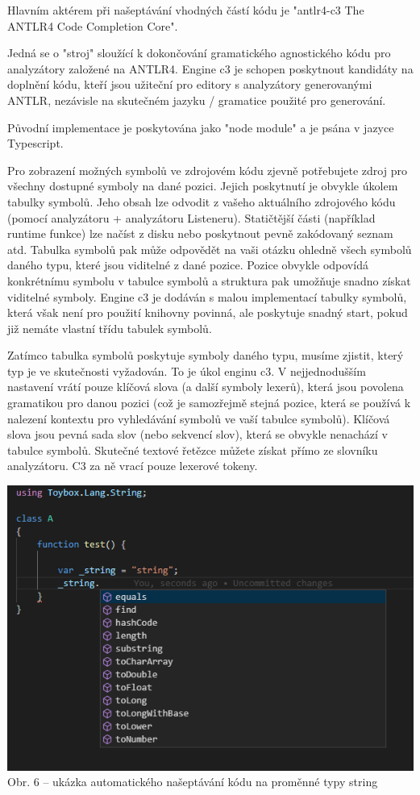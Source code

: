 \documentclass[czech,master,dept460,male,cpp,cpdeclaration]{diploma}
\begin{document}
Hlavním aktérem při našeptávání vhodných částí kódu je "antlr4-c3 The ANTLR4 Code Completion Core".

Jedná se o "stroj" sloužící k dokončování gramatického agnostického kódu pro analyzátory založené na ANTLR4. Engine c3 je schopen poskytnout kandidáty na doplnění kódu, kteří jsou užiteční pro editory s analyzátory generovanými ANTLR, nezávisle na skutečném jazyku / gramatice použité pro generování.

Původní implementace je poskytována jako "node module" a je psána v jazyce Typescript.

Pro zobrazení možných symbolů ve zdrojovém kódu zjevně potřebujete zdroj pro všechny dostupné symboly na dané pozici. Jejich poskytnutí je obvykle úkolem tabulky symbolů. Jeho obsah lze odvodit z vašeho aktuálního zdrojového kódu (pomocí analyzátoru + analyzátoru Listeneru). Statičtější části (například runtime funkce) lze načíst z disku nebo poskytnout pevně zakódovaný seznam atd. Tabulka symbolů pak může odpovědět na vaši otázku ohledně všech symbolů daného typu, které jsou viditelné z dané pozice. Pozice obvykle odpovídá konkrétnímu symbolu v tabulce symbolů a struktura pak umožňuje snadno získat viditelné symboly. Engine c3 je dodáván s malou implementací tabulky symbolů, která však není pro použití knihovny povinná, ale poskytuje snadný start, pokud již nemáte vlastní třídu tabulek symbolů.

Zatímco tabulka symbolů poskytuje symboly daného typu, musíme zjistit, který typ je ve skutečnosti vyžadován. To je úkol enginu c3. V nejjednodušším nastavení vrátí pouze klíčová slova (a další symboly lexerů), která jsou povolena gramatikou pro danou pozici (což je samozřejmě stejná pozice, která se používá k nalezení kontextu pro vyhledávání symbolů ve vaší tabulce symbolů). Klíčová slova jsou pevná sada slov (nebo sekvencí slov), která se obvykle nenachází v tabulce symbolů. Skutečné textové řetězce můžete získat přímo ze slovníku analyzátoru. C3 za ně vrací pouze lexerové tokeny.

\begin{center}
	\includegraphics[scale=1]{autocomplete_example}
	\\	
	Obr. 6 – ukázka automatického našeptávání kódu na proměnné typy string
\end{center}
\end{document}
